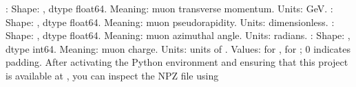 \markdownRendererUlItem {}:\markdownRendererInterblockSeparator
{}\markdownRendererUlBeginTight
\markdownRendererUlItem Shape: , dtype float64.\markdownRendererUlItemEnd 
\markdownRendererUlItem Meaning: muon transverse momentum.\markdownRendererUlItemEnd 
\markdownRendererUlItem Units: GeV.\markdownRendererUlItemEnd 
\markdownRendererUlEndTight \markdownRendererUlItemEnd 
\markdownRendererUlItem {}:\markdownRendererInterblockSeparator
{}\markdownRendererUlBeginTight
\markdownRendererUlItem Shape: , dtype float64.\markdownRendererUlItemEnd 
\markdownRendererUlItem Meaning: muon pseudorapidity.\markdownRendererUlItemEnd 
\markdownRendererUlItem Units: dimensionless.\markdownRendererUlItemEnd 
\markdownRendererUlEndTight \markdownRendererUlItemEnd 
\markdownRendererUlItem {}:\markdownRendererInterblockSeparator
{}\markdownRendererUlBeginTight
\markdownRendererUlItem Shape: , dtype float64.\markdownRendererUlItemEnd 
\markdownRendererUlItem Meaning: muon azimuthal angle.\markdownRendererUlItemEnd 
\markdownRendererUlItem Units: radians.\markdownRendererUlItemEnd 
\markdownRendererUlEndTight \markdownRendererUlItemEnd 
\markdownRendererUlItem {}:\markdownRendererInterblockSeparator
{}\markdownRendererUlBeginTight
\markdownRendererUlItem Shape: , dtype int64.\markdownRendererUlItemEnd 
\markdownRendererUlItem Meaning: muon charge.\markdownRendererUlItemEnd 
\markdownRendererUlItem Units: units of .\markdownRendererUlItemEnd 
\markdownRendererUlItem Values:  for \markdownRendererInlineMath{\mu^+},  for \markdownRendererInlineMath{\mu^-}; 0 indicates padding.\markdownRendererUlItemEnd 
\markdownRendererUlEndTight \markdownRendererUlItemEnd 
\markdownRendererUlEnd \markdownRendererInterblockSeparator
{}
\markdownRendererSectionEnd 
\markdownRendererSectionEnd 
\markdownRendererSectionEnd \markdownRendererSectionBegin
{}\markdownRendererInterblockSeparator
{}\markdownRendererSectionBegin
{}\markdownRendererInterblockSeparator
{}After activating the Python environment and ensuring that this project is available at , you can inspect the NPZ file using\markdownRendererInterblockSeparator
